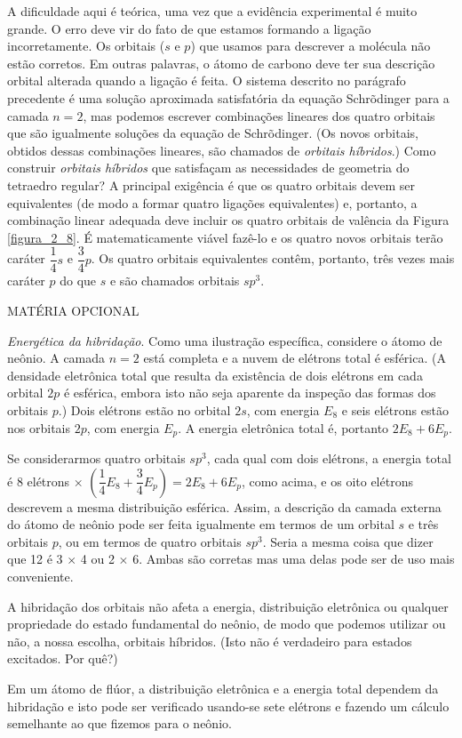 A dificuldade aqui é teórica, uma vez que a evidência experimental é muito grande. O erro deve vir do fato de que estamos formando a ligação  incorretamente. Os orbitais ($s$ e $p$) que usamos para descrever a molécula não estão corretos. Em outras palavras, o átomo de carbono deve ter sua descrição orbital alterada quando a ligação é feita. O sistema descrito no parágrafo precedente é uma solução aproximada satisfatória da equação Schrõdinger para a camada $n = 2$, mas podemos escrever combinações lineares dos quatro orbitais que são igualmente soluções da equação de Schrõdinger. (Os novos orbitais, obtidos dessas combinações lineares, são chamados de \textit{orbitais híbridos}.) Como construir \textit{orbitais híbridos} que satisfaçam as necessidades de geometria do tetraedro regular? A principal exigência é que os quatro orbitais devem ser equivalentes (de modo a formar quatro ligações  equivalentes) e, portanto, a combinação linear adequada deve incluir os quatro orbitais de valência da Figura \ref{figura_2_8}. É matematicamente viável fazê-lo e os quatro novos orbitais terão caráter $\dfrac{1}{4} s$ e $\dfrac{3}{4}p$. Os quatro orbitais equivalentes contêm, portanto, três vezes mais caráter $p$ do que $s$ e são chamados orbitais $sp^3$.
\par\bigskip

\begin{leftbar}[cut=false]
\footnotesize

\noindent MATÉRIA OPCIONAL

\noindent \textit{Energética da hibridação}. Como uma ilustração específica, considere o átomo de neônio. A camada $n = 2$ está completa e a nuvem de elétrons total é esférica. (A densidade eletrônica total que resulta da existência de dois elétrons em cada orbital $2p$ é esférica, embora isto não seja aparente da inspeção das formas dos orbitais $p$.) Dois elétrons estão no orbital $2s$, com energia $E_8$ e seis elétrons estão nos orbitais $2p$, com energia $E_p$. A energia eletrônica total é, portanto $2E_8 + 6E_p$.

Se considerarmos quatro orbitais $sp^3$, cada qual com dois elétrons, a energia total é 8 elétrons $\times$ $(\dfrac{1}{4}E_8 + \dfrac{3}{4}E_p) = 2E_8 + 6E_p$, como acima, e os oito elétrons descrevem a mesma distribuição esférica. Assim, a descrição da camada externa do átomo de neônio pode ser feita igualmente em termos de um orbital $s$ e três orbitais $p$, ou em termos de quatro orbitais $sp^3$. Seria a mesma coisa que dizer que 12 é 3 $\times$ 4 ou 2 $\times$ 6. Ambas são corretas mas uma delas pode ser de uso mais conveniente. 

A hibridação dos orbitais não afeta a energia, distribuição eletrônica ou qualquer propriedade do estado fundamental do neônio, de modo que podemos utilizar ou não, a nossa escolha, orbitais híbridos. (Isto não é verdadeiro para estados excitados. Por quê?) 

Em um átomo de flúor, a distribuição eletrônica e a energia total dependem da hibridação e isto pode ser verificado usando-se sete elétrons e fazendo um cálculo semelhante ao que fizemos para o neônio. 
\end{leftbar}
\par\bigskip

